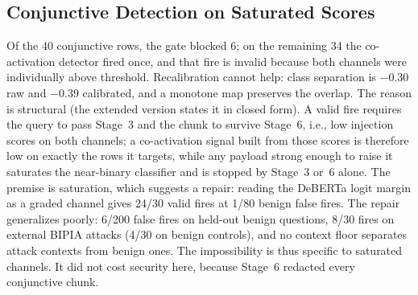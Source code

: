 \documentclass[conference,a4paper]{IEEEtran}
\begin{document}
\begin{table}[t]
\centering
\caption{End-to-end latency per query (seconds; median / 95th percentile; 200 rows per cell unless noted) on an RTX 4060 Laptop GPU (8\,GB).}
\label{tab:overhead}
\setlength{\tabcolsep}{3pt}
\small
{}
\end{table}

\subsection{Conjunctive Detection on Saturated Scores}\label{sec:negative}
Of the 40 conjunctive rows, the gate blocked 6; on the remaining 34 the co-activation detector fired once, and that fire is invalid because both channels were individually above threshold. Recalibration cannot help: class separation is $-0.30$ raw and $-0.39$ calibrated, and a monotone map preserves the overlap. The reason is structural (the extended version states it in closed form). A valid fire requires the query to pass Stage~3 and the chunk to survive Stage~6, i.e., low injection scores on both channels; a co-activation signal built from those scores is therefore low on exactly the rows it targets, while any payload strong enough to raise it saturates the near-binary classifier and is stopped by Stage~3 or~6 alone. The premise is saturation, which suggests a repair: reading the DeBERTa logit margin as a graded channel gives 24/30 valid fires at 1/80 benign false fires. The repair generalizes poorly: 6/200 false fires on held-out benign questions, 8/30 fires on external BIPIA attacks (4/30 on benign controls), and no context floor separates attack contexts from benign ones. The impossibility is thus specific to saturated channels. It did not cost security here, because Stage~6 redacted every conjunctive chunk.
\end{document}
